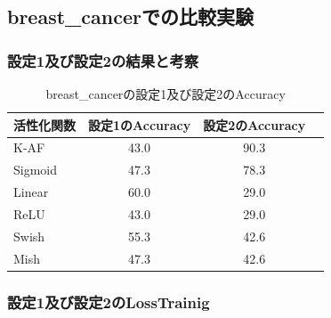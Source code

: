 \subsection{breast\_cancerでの比較実験}
\label{ev:breastcancer}

\subsubsection{設定1及び設定2の結果と考察}


\begin{table}[htbp]
    \begin{center}
        \caption{breast\_cancerの設定1及び設定2のAccuracy}
        \vspace{2mm} 
        \begin{tabular}{l*{2}{c}r}
            活性化関数              & 設定1のAccuracy &  設定2のAccuracy \\
            \hline
            K-AF            & 43.0 & 90.3 \\
            Sigmoid            & 47.3 & 78.3\\
            Linear            & 60.0 & 29.0\\
            ReLU        & 43.0 & 29.0\\
            Swish           & 55.3 & 42.6\\
            Mish           & 47.3 & 42.6\\
    
        \end{tabular}
    \end{center}
\end{table}




\subsubsection{設定1及び設定2のLossTrainig}
\label{breastcancer:loss}

